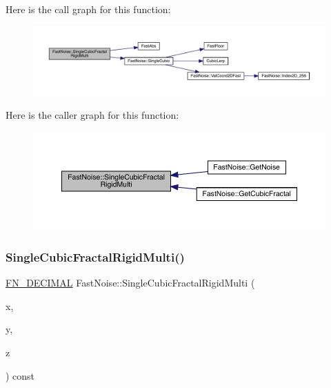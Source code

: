 Here is the call graph for this function\+:
\nopagebreak
\begin{figure}[H]
\begin{center}
\leavevmode
\includegraphics[width=350pt]{d1/dd8/class_fast_noise_ae8f66a142a0206d4907a5dab291f4b3d_cgraph}
\end{center}
\end{figure}
Here is the caller graph for this function\+:
\nopagebreak
\begin{figure}[H]
\begin{center}
\leavevmode
\includegraphics[width=350pt]{d1/dd8/class_fast_noise_ae8f66a142a0206d4907a5dab291f4b3d_icgraph}
\end{center}
\end{figure}
\mbox{\label{class_fast_noise_ab460847f52a3b64ac6ebbda5538c9c9a}} 
\subsubsection{\texorpdfstring{Single\+Cubic\+Fractal\+Rigid\+Multi()}{SingleCubicFractalRigidMulti()}\hspace{0.1cm}{\footnotesize\ttfamily [2/2]}}
{\footnotesize\ttfamily \mbox{\hyperlink{_fast_noise_8h_a75a9ef6d2541c4921815b885bfd449c3}{F\+N\+\_\+\+D\+E\+C\+I\+M\+AL}} Fast\+Noise\+::\+Single\+Cubic\+Fractal\+Rigid\+Multi (\begin{DoxyParamCaption}\item[{\mbox{\hyperlink{_fast_noise_8h_a75a9ef6d2541c4921815b885bfd449c3}{F\+N\+\_\+\+D\+E\+C\+I\+M\+AL}}}]{x,  }\item[{\mbox{\hyperlink{_fast_noise_8h_a75a9ef6d2541c4921815b885bfd449c3}{F\+N\+\_\+\+D\+E\+C\+I\+M\+AL}}}]{y,  }\item[{\mbox{\hyperlink{_fast_noise_8h_a75a9ef6d2541c4921815b885bfd449c3}{F\+N\+\_\+\+D\+E\+C\+I\+M\+AL}}}]{z }\end{DoxyParamCaption}) const\hspace{0.3cm}{\ttfamily [private]}}

